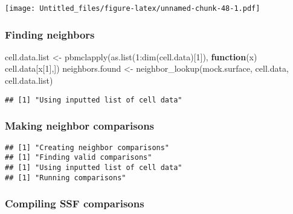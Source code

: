\documentclass[
]{article}
\newenvironment{Shaded}{\begin{snugshade}}{\end{snugshade}}
\newcommand{\AttributeTok}[1]{\textcolor[rgb]{0.77,0.63,0.00}{#1}}
\newcommand{\ControlFlowTok}[1]{\textcolor[rgb]{0.13,0.29,0.53}{\textbf{#1}}}
\newcommand{\DecValTok}[1]{\textcolor[rgb]{0.00,0.00,0.81}{#1}}
\newcommand{\FloatTok}[1]{\textcolor[rgb]{0.00,0.00,0.81}{#1}}
\newcommand{\FunctionTok}[1]{\textcolor[rgb]{0.00,0.00,0.00}{#1}}
\newcommand{\NormalTok}[1]{#1}
\newcommand{\OtherTok}[1]{\textcolor[rgb]{0.56,0.35,0.01}{#1}}
\newcommand{\SpecialCharTok}[1]{\textcolor[rgb]{0.00,0.00,0.00}{#1}}
\begin{document}
\texttt{[image: Untitled\_files/figure-latex/unnamed-chunk-48-1.pdf]}

\hypertarget{finding-neighbors-2}{%
\subsubsection{Finding neighbors}\label{finding-neighbors-2}}

\begin{Shaded}
\begin{Highlighting}[]
\NormalTok{cell.data.list }\OtherTok{\textless{}{-}} \FunctionTok{pbmclapply}\NormalTok{(}\FunctionTok{as.list}\NormalTok{(}\DecValTok{1}\SpecialCharTok{:}\FunctionTok{dim}\NormalTok{(cell.data)[}\DecValTok{1}\NormalTok{]), }\ControlFlowTok{function}\NormalTok{(x) cell.data[x[}\DecValTok{1}\NormalTok{],])}
\NormalTok{neighbors.found }\OtherTok{\textless{}{-}} \FunctionTok{neighbor\_lookup}\NormalTok{(mock.surface, cell.data, cell.data.list)}
\end{Highlighting}
\end{Shaded}

\begin{verbatim}
## [1] "Using inputted list of cell data"
\end{verbatim}

\hypertarget{making-neighbor-comparisons-2}{%
\subsubsection{Making neighbor
comparisons}\label{making-neighbor-comparisons-2}}

\begin{Shaded}
\end{Shaded}

\begin{verbatim}
## [1] "Creating neighbor comparisons"
## [1] "Finding valid comparisons"
## [1] "Using inputted list of cell data"
## [1] "Running comparisons"
\end{verbatim}

\hypertarget{compiling-ssf-comparisons-2}{%
\subsubsection{Compiling SSF
comparisons}\label{compiling-ssf-comparisons-2}}
\end{document}
